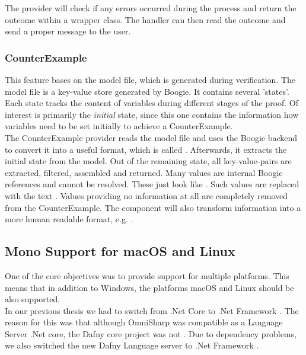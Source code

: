 The provider will check if any errors occurred during the process and return the outcome within a wrapper class.
The handler can then read the outcome and send a proper message to the user.

\subsubsection{CounterExample}
This feature bases on the model file, which is generated during verification.
The model file is a key-value store generated by Boogie.
It contains several 'states'.
Each state tracks the content of variables during different stages of the proof.
Of interest is primarily the \textit{initial} state, since this one contains the information how variables
need to be set initially to achieve a CounterExample.\\

The CounterExample provider reads the model file and uses the Boogie backend to convert it into a useful format, which is called .
Afterwards, it extracts the initial state from the model.
Out of the remaining state, all key-value-pairs are extracted, filtered, assembled and returned.
Many values are internal Boogie references and cannot be resolved.
These just look like .
Such values are replaced with the text .
Values providing no information at all are completely removed from the CounterExample.
The component will also transform information into a more human readable format, e.g. .\\






\subsection{Mono Support for macOS and Linux}
\label{section:implementation:mono}
One of the core objectives was to provide support for multiple platforms.
This means that in addition to Windows, the platforms macOS and Linux should be also supported. \\

In our previous thesis we had to switch from .Net Core to .Net Framework \cite{sa}.
The reason for this was that although OmniSharp was compatible as a Language Server .Net core,
the Dafny core project was not \cite{sa}.
Due to dependency problems, we also switched the new Dafny Language server to .Net Framework \cite{sa}. \\

